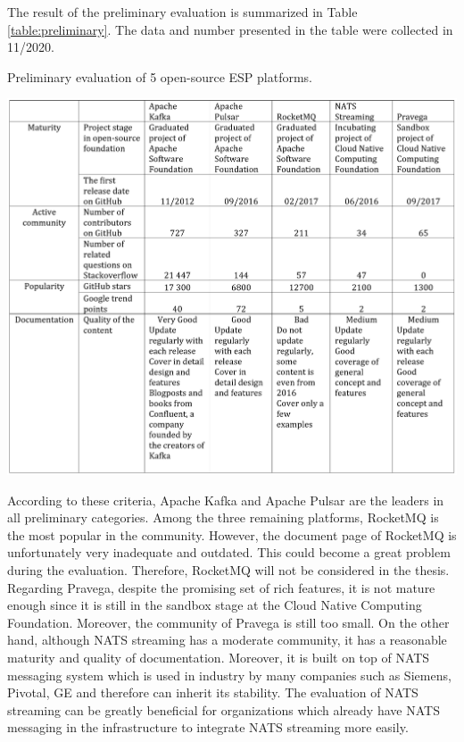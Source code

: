 The result of the preliminary evaluation is summarized in Table \ref{table:preliminary}. The data and number presented in the table were collected in 11/2020.

\begin{table}[h]
	\caption{Preliminary evaluation of 5 open-source ESP platforms.}
	\label{table:preliminary}
	\includegraphics[width=\linewidth]{images/preliminary}
\end{table}

According to these criteria, Apache Kafka and Apache Pulsar are the leaders in all preliminary categories. Among the three remaining platforms, RocketMQ is the most popular in the community. However, the document page of RocketMQ is unfortunately very inadequate and outdated. This could become a great problem during the evaluation.  Therefore, RocketMQ will not be considered in the thesis. Regarding Pravega, despite the promising set of rich features, it is not mature enough since it is still in the sandbox stage at the Cloud Native Computing Foundation. Moreover, the community of Pravega is still too small. On the other hand, although NATS streaming has a moderate community, it has a reasonable maturity and quality of documentation. Moreover, it is built on top of NATS messaging system which is used in industry by many companies such as Siemens, Pivotal, GE and therefore can inherit its stability. The evaluation of NATS streaming can be greatly beneficial for organizations which already have NATS messaging in the infrastructure to integrate NATS streaming more easily.

